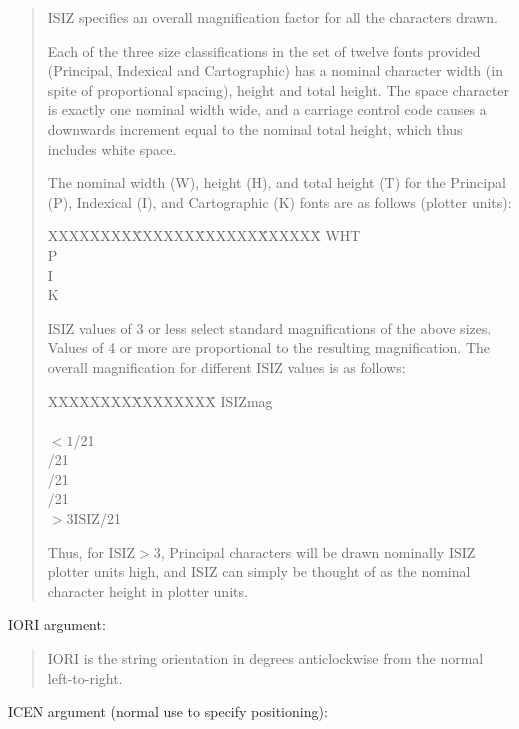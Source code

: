 \begin{quote}
ISIZ specifies an overall magnification factor for all the characters drawn.

Each of the three size classifications in the set of twelve
fonts provided (Principal, Indexical and Cartographic) has a
nominal character width (in spite of proportional spacing),
height and total height.  The space character is exactly one
nominal width wide, and a carriage control code causes
a downwards increment equal to the nominal total height, which
thus includes white space.

The nominal width (W), height (H), and total height (T) for
the Principal (P), Indexical (I), and Cartographic (K) fonts
are as follows (plotter units):

\begin{tabbing}
XXXXXXXX\=XXXXXX\=XXXXXX\=XXXXXX\=\kill
\>\>W\>H\>T\\
\>P\\
\>I\\
\>K
\end{tabbing}

ISIZ values of 3 or less select standard magnifications of the
above sizes.  Values of 4 or more are proportional to the
resulting magnification.  The overall magnification for
different ISIZ values is as follows:

\begin{tabbing}
XXXXXXXX\=XXXXXXXX\=\kill
\>ISIZ\>mag\\
\\
\>$<1$/21\\
/21\\
/21\\
/21\\
\>$>3$\>ISIZ/21\\
\end{tabbing}

Thus, for ISIZ$>$3, Principal characters will be drawn nominally
ISIZ plotter units high, and ISIZ can simply be thought of
as the nominal character height in plotter units.
\end{quote}

IORI argument:

\begin{quote}
IORI is the string orientation in degrees anticlockwise from the normal
left-to-right.
\end{quote}

ICEN argument (normal use to specify positioning):

